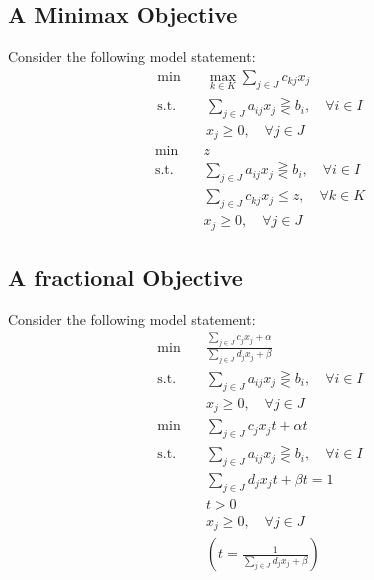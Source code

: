 \documentclass[10pt]{book}
\begin{document}
				\subsection{A Minimax Objective}
					Consider the following model statement:
					\begin{align}
						\min \quad & \max_{k\in K}\sum_{j\in J}c_{kj}x_j \nonumber\\
						\text{s.t.} \quad & \sum_{j\in J}a_{ij}x_j \gtreqless b_i, \quad \forall i\in I \nonumber\\
						                  & x_j \ge 0, \quad \forall j\in J \nonumber
					\end{align}
					\begin{align}
						\min \quad & z \nonumber\\
						\text{s.t.} \quad & \sum_{j\in J}a_{ij}x_j \gtreqless b_i, \quad \forall i\in I \nonumber\\
										  & \sum_{j\in J}c_{kj}x_j \le z, \quad \forall k\in K \nonumber\\
						                  & x_j \ge 0, \quad \forall j\in J \nonumber
					\end{align}
				\subsection{A fractional Objective}
					Consider the following model statement:
					\begin{align}
						\min \quad & \frac{\sum_{j\in J}c_{j}x_j + \alpha}{\sum_{j\in J}d_{j}x_j + \beta} \nonumber\\
						\text{s.t.} \quad & \sum_{j\in J}a_{ij}x_j \gtreqless b_i, \quad \forall i\in I \nonumber\\
						                  & x_j \ge 0, \quad \forall j\in J \nonumber
					\end{align}
					\begin{align}
						\min \quad & \sum_{j\in J}c_{j}x_jt + \alpha t \nonumber\\
						\text{s.t.} \quad & \sum_{j\in J}a_{ij}x_j \gtreqless b_i, \quad \forall i\in I \nonumber\\
										  & \sum_{j\in J}d_jx_jt + \beta t = 1\nonumber\\
										  & t > 0 \nonumber\\
						                  & x_j \ge 0, \quad \forall j\in J \nonumber\\
						                  & (t = \frac1{\sum_{j\in J}d_jx_j + \beta}) \nonumber
					\end{align}
\end{document}
